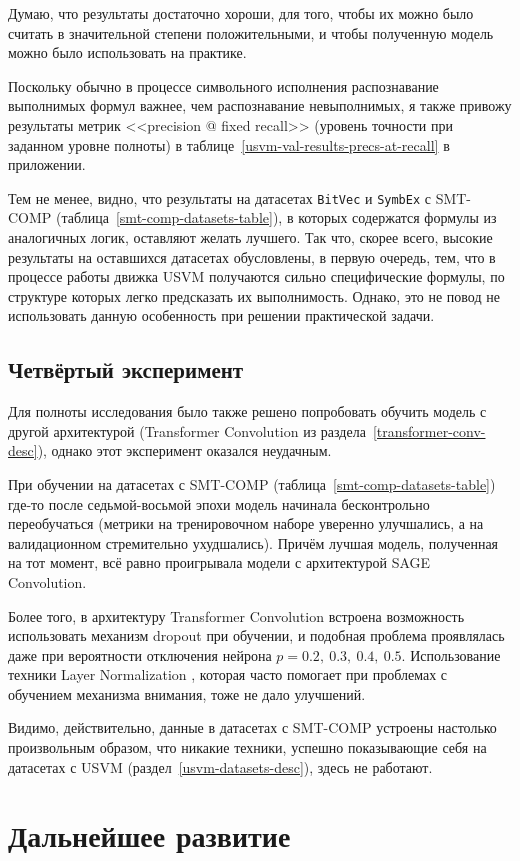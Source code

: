 
Думаю, что результаты достаточно хороши, для того, чтобы их можно было считать в значительной степени положительными, и чтобы полученную модель можно было использовать на практике.

Поскольку обычно в процессе символьного исполнения распознавание выполнимых формул важнее, чем распознавание невыполнимых, я также привожу результаты метрик <<precision @ fixed recall>> (уровень точности при заданном уровне полноты) в таблице~\ref{usvm-val-results-precs-at-recall} в приложении.

Тем не менее, видно, что результаты на датасетах \texttt{BitVec} и \texttt{SymbEx} с SMT-COMP (таблица~\ref{smt-comp-datasets-table}), в которых содержатся формулы из аналогичных логик, оставляют желать лучшего. Так что, скорее всего, высокие результаты на оставшихся датасетах обусловлены, в первую очередь, тем, что в процессе работы движка USVM получаются сильно специфические формулы, по структуре которых легко предсказать их выполнимость. Однако, это не повод не использовать данную особенность при решении практической задачи.

\subsection{Четвёртый эксперимент}

Для полноты исследования было также решено попробовать обучить модель с другой архитектурой (Transformer Convolution из раздела~\ref{transformer-conv-desc}), однако этот эксперимент оказался неудачным.

При обучении на датасетах с SMT-COMP (таблица~\ref{smt-comp-datasets-table}) где-то после седьмой-восьмой эпохи модель начинала бесконтрольно переобучаться (метрики на тренировочном наборе уверенно улучшались, а на валидационном стремительно ухудшались). Причём лучшая модель, полученная на тот момент, всё равно проигрывала модели с архитектурой SAGE Convolution.

Более того, в архитектуру Transformer Convolution встроена возможность использовать механизм dropout \cite{dropout-paper} при обучении, и подобная проблема проявлялась даже при вероятности отключения нейрона $p = 0.2, \ 0.3, \ 0.4, \ 0.5$. Использование техники Layer Normalization \cite{layer-norm-paper}, которая часто помогает при проблемах с обучением механизма внимания, тоже не дало улучшений.

Видимо, действительно, данные в датасетах с SMT-COMP устроены настолько произвольным образом, что никакие техники, успешно показывающие себя на датасетах с USVM (раздел~\ref{usvm-datasets-desc}), здесь не работают.

\newpage

\section{Дальнейшее развитие}

